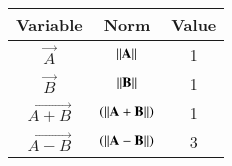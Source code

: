 \begin{center}
    \begin{tabular}{|c|c|c|} 
        \hline
            \textbf{Variable} & \textbf{Norm} & \textbf{Value} \\ 
        \hline
            $\vec{A}$   & $\left\vert\left\vert\mathbf{A}\right\vert\right\vert$ & 1 \\ 
        \hline
            $\vec{B}$   & $\left\vert\left\vert\mathbf{B}\right\vert\right\vert$ & 1 \\ 
        \hline
            $\vec{A+B}$   & $\left(\left\vert\left\vert\mathbf{A}+\mathbf{B}\right\vert\right\vert\right)$ & 1 \\
        \hline
            $\vec{A-B}$  & $\left(\left\vert\left\vert\mathbf{A}-\mathbf{B}\right\vert\right\vert\right)$ & 3 \\
        \hline
    \end{tabular}
\end{center}  
